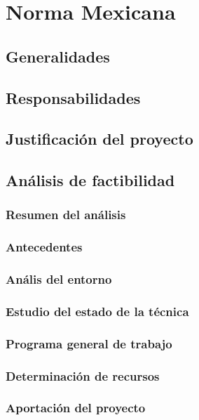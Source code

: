 \documentclass[]{article}
\title{}
\author{Yael Atletl Bueno Rojas, Kevin Pen\~a Mora, Jos\'e \'Angel }
\begin{document}
\maketitle

\begin{abstract}

\end{abstract}
\tableofcontents

\section{Norma Mexicana}
\subsection{Generalidades}
\subsection{Responsabilidades}
\subsection{Justificaci\'on del proyecto}
\subsection{An\'alisis de factibilidad}
\subsubsection{Resumen del an\'alisis}
\subsubsection{Antecedentes}
\subsubsection{An\'alis del entorno}
\subsubsection{Estudio del estado de la t\'ecnica}
\subsubsection{Programa general de trabajo}
\subsubsection{Determinaci\'on de recursos}
\subsubsection{Aportaci\'on del proyecto}
\end{document}
